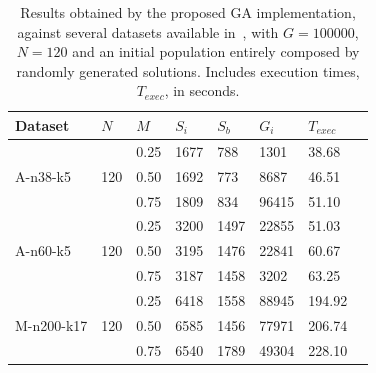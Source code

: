 \begin{table}[h!]
    \centering
    \begin{threeparttable}
    \footnotesize
        \begin{tabularx}{0.45\textwidth}{ l X X X X X X X}
            \toprule
            \textbf{Dataset} & $N$ & $M$ & $S_i$ & $S_b$ & $G_i$ & $T_{exec}$\\ [0.5ex]
            \midrule
            \multirow{3}{*}{A-n38-k5}   & \multirow{3}{*}{120}  & 0.25  & 1677 & 788 & 1301     & 38.68\\ [0.5ex]
                                        &                       & 0.50  & 1692 & 773 & 8687     & 46.51\\ [0.5ex]
                                        &                       & 0.75  & 1809 & 834 & 96415    & 51.10\\ [0.5ex]
            \midrule
            \multirow{3}{*}{A-n60-k5}   & \multirow{3}{*}{120}  & 0.25  & 3200 & 1497 & 22855   & 51.03\\ [0.5ex]
                                        &                       & 0.50  & 3195 & 1476 & 22841   & 60.67\\ [0.5ex]
                                        &                       & 0.75  & 3187 & 1458 & 3202    & 63.25\\ [0.5ex]
            \midrule
            \multirow{3}{*}{M-n200-k17} & \multirow{3}{*}{120}  & 0.25  & 6418 & 1558 & 88945   & 194.92\\ [0.5ex]
                                        &                       & 0.50  & 6585 & 1456 & 77971   & 206.74\\ [0.5ex]
                                        &                       & 0.75  & 6540 & 1789 & 49304   & 228.10\\ [0.5ex]
            \bottomrule
        \end{tabularx}
    \caption{Results obtained by the proposed GA implementation, against 
            several datasets available in~\cite{website:cvrp-datasets}, with 
            $G = 100000$, $N = 120$ and an initial population entirely composed by 
            randomly generated solutions. 
            Includes execution times, $T_{exec}$, in seconds.}
    \label{tab:ga-results-2}
    \end{threeparttable}
\end{table}


